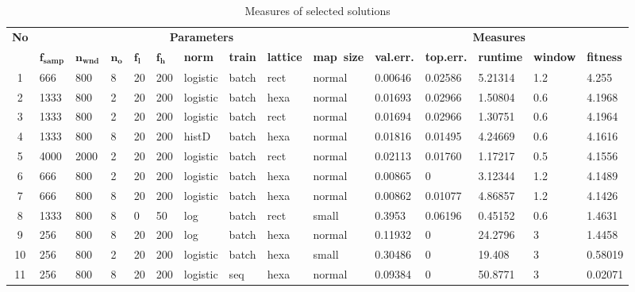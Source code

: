 \documentclass[a4paper,jurnal]{IEEEtran}
\begin{document}
\begin{table}[b]
\caption{Measures of selected solutions}
		\begin{tabular}{|c||p{8mm}|p{8mm}|p{4mm}|p{4mm}|m{5mm} |p{8.5mm}|p{7mm}|p{8mm}|p{11mm} ||p{10mm}|p{10mm}|p{10mm}|p{10mm}|p{10mm}|}
			\hline
			\multirow{2}{*}{\textbf{No}} & 
			\multicolumn{9}{c||}{\textbf{Parameters}} & 
			\multicolumn{5}{c|}{\textbf{Measures}} \\
			\cline{2-15}
			&
			$ \mathbf{f_{samp}} $& 
			$ \mathbf{n_{wnd}} $& 
			$ \mathbf{n_o} $&
			$ \mathbf{f_l} $&
			$ \mathbf{f_h} $& 
			\textbf{norm}&
			\textbf{train}&
			\textbf{lattice} &
			\textbf{map~size} &
			\textbf{val.err.}&
			\textbf{top.err.}&
			\textbf{runtime}&
			\textbf{window}& 
			\textbf{fitness}\\
			\hline\hline

  1 & 666 & 800 & 8 & 20 & 200 & logistic & batch & rect & normal   & 0.00646 &  0.02586 &  5.21314 &  1.2 &    4.255 \\ \hline
  2 & 1333 & 800 & 2 & 20 & 200 & logistic & batch & hexa & normal  &  0.01693 &  0.02966 &  1.50804 &  0.6 &   4.1968 \\ \hline
  3 & 1333 & 800 & 2 & 20 & 200 & logistic & batch & rect & normal  &  0.01694 &  0.02966 &  1.30751 &  0.6 &   4.1964 \\ \hline
  4 & 1333 & 800 & 8 & 20 & 200 & histD & batch & hexa & normal     &  0.01816 &  0.01495 &  4.24669 &  0.6 &   4.1616 \\ \hline
  5 & 4000 & 2000 & 2 & 20 & 200 & logistic & batch & rect & normal &  0.02113 &  0.01760 &  1.17217 &  0.5 &   4.1556 \\ \hline
  6 & 666 & 800 & 2 & 20 & 200 & logistic & batch & hexa & normal   &  0.00865 &         0 &  3.12344 &  1.2 &   4.1489 \\ \hline
  7 & 666 & 800 & 8 & 20 & 200 & logistic & batch & hexa & normal   &  0.00862 &  0.01077 &  4.86857 &  1.2 &   4.1426 \\ \hline


8 & 1333 & 800 & 8 &  0 & 50 & log & batch & rect & small  &  0.3953 &  0.06196 &  0.45152 &  0.6 &   1.4631 \\ \hline
9 & 256 & 800 & 8 & 20 & 200 & log & batch & hexa & normal        &   0.11932 &         0 &  24.2796 &    3 &   1.4458 \\ \hline
10 & 256 & 800 & 2 & 20 & 200 & logistic & batch & hexa & small    &   0.30486 &         0 &   19.408 &    3 &  0.58019 \\ \hline
11 & 256 & 800 & 8 & 20 & 200 & logistic & seq & hexa & normal     &  0.09384 &         0 &  50.8771 &    3 & 0.02071 \\ \hline
	
		\end{tabular}
\label{tbl:somresults}
\end{table}
\end{document}
